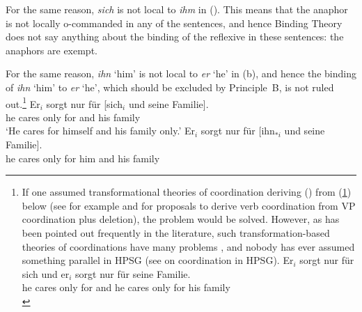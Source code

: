 \documentclass[output=paper,biblatex,babelshorthands,newtxmath,draftmode,colorlinks,citecolor=brown]{langscibook}
\begin{document}
For the same reason, \emph{sich} is not local to \emph{ihm} in (). This means that the anaphor is not locally o-commanded in any
of the sentences, and hence Binding Theory does not say anything about the binding of the reflexive
in these sentences: the anaphors are exempt. 
%

For the same reason, \emph{ihn} `him' is not local to \emph{er} `he' in (b), and hence the
binding of \emph{ihn} `him' to \emph{er} `he', which should be excluded by Principle~B, is not ruled
out.\footnote{
If one assumed transformational theories of coordination deriving () from
(\ref{ex-er-sorgt-nur-fuer-sich-und-er-sorgt-nur}) below (see for example
\citealp[]{WC80a-u} and \citealp[, 67]{Kayne94a-u} for proposals to derive verb
coordination from VP coordination plus deletion), the problem would be solved. However, as has been
pointed out frequently in the literature, such transformation-based theories of coordinations have
many problems \parencites[]{BV72}[--193]{Jackendoff77a}[]{Dowty79a}[--105]{denBesten83a}{Klein85}{Eisenberg94a}[]{Borsley2005a}, and nobody has ever assumed
something parallel in HPSG (see  on coordination in HPSG).
\ea
\label{ex-er-sorgt-nur-fuer-sich-und-er-sorgt-nur}
\gll Er$_{i}$ sorgt nur für sich     und er$_{i}$ sorgt nur für seine Familie.\\
     he      cares only for \self{} and he       cares only for his family\\
\z
}
\eal
\label{ex-sorgt-fuer-sich-und-seine-familie}
\ex
\gll Er$_{i}$ sorgt nur für [sich$_{i}$ und seine Familie].\\
     he      cares only for \spacebr{}\self{} and his family\\
\glt `He cares for himself and his family only.'
\ex 
\gll Er$_{i}$ sorgt nur für [ihn$_{*i}$ und seine Familie].\\
     he      cares only for \spacebr{}him and his family\\
\zl
\end{document}
